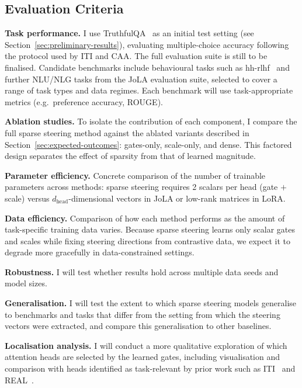 \subsection{Evaluation Criteria}\label{sec:evaluation-criteria}

\textbf{Task performance.} I use TruthfulQA~\cite{lin2022truthfulqa} as an initial test setting (see Section~\ref{sec:preliminary-results}), evaluating multiple-choice accuracy following the protocol used by ITI and CAA.
The full evaluation suite is still to be finalised. Candidate benchmarks include behavioural tasks such as hh-rlhf~\cite{bai2022hhrlhf} and further NLU/NLG tasks from the JoLA evaluation suite, selected to cover a range of task types and data regimes.
Each benchmark will use task-appropriate metrics (e.g.\ preference accuracy, ROUGE).

\textbf{Ablation studies.} To isolate the contribution of each component, I compare the full sparse steering method against the ablated variants described in Section~\ref{sec:expected-outcomes}: gates-only, scale-only, and dense.
This factored design separates the effect of sparsity from that of learned magnitude.

\textbf{Parameter efficiency.} Concrete comparison of the number of trainable parameters across methods: sparse steering requires 2 scalars per head (gate $+$ scale) versus $d_\text{head}$-dimensional vectors in JoLA or low-rank matrices in LoRA.

\textbf{Data efficiency.} Comparison of how each method performs as the amount of task-specific training data varies. Because sparse steering learns only scalar gates and scales while fixing steering directions from contrastive data, we expect it to degrade more gracefully in data-constrained settings.

\textbf{Robustness.} I will test whether results hold across multiple data seeds and model sizes.

\textbf{Generalisation.} I will test the extent to which sparse steering models generalise to benchmarks and tasks that differ from the setting from which the steering vectors were extracted, and compare this generalisation to other baselines.

\textbf{Localisation analysis.} I will conduct a more qualitative exploration of which attention heads are selected by the learned gates, including visualisation and comparison with heads identified as task-relevant by prior work such as ITI~\cite{li2024iti} and REAL~\cite{zhan2026real}.
